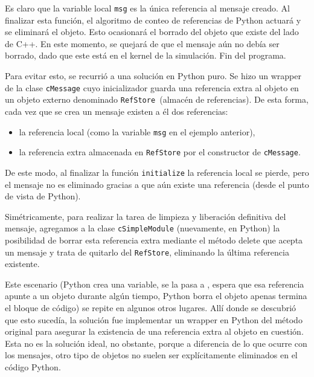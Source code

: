 \inputminted{Python}{codelistings/txc1.py}

Es claro que la variable local \verb!msg! es la única referencia al mensaje
creado. Al finalizar esta función, el algoritmo de conteo de referencias de
Python actuará y se eliminará el objeto. Esto ocasionará el borrado del objeto
que existe del lado de C++. En este momento, \omnetpp{} se quejará de que el
mensaje aún no debía ser borrado, dado que este está en el kernel de la
simulación. Fin del programa.

Para evitar esto, se recurrió a una solución en Python puro. Se hizo un wrapper
de la clase \verb!cMessage! cuyo inicializador guarda una referencia extra al objeto
en un objeto externo denominado \verb!RefStore !(almacén de referencias). De esta
forma, cada vez que se crea un mensaje existen a él dos referencias:

\begin{itemize}
    \item la referencia local (como la variable \verb!msg! en el ejemplo
anterior),

    \item la referencia extra almacenada en \verb!RefStore! por el constructor
de \verb!cMessage!.
\end{itemize}

De este modo, al finalizar la función \verb!initialize! la referencia local se
pierde, pero el mensaje no es eliminado gracias a que aún existe una referencia
(desde el punto de vista de Python). 

Simétricamente, para realizar la tarea de limpieza y liberación definitiva del
mensaje, agregamos a la clase \verb!cSimpleModule! (nuevamente, en Python) la
posibilidad de borrar esta referencia extra mediante el método delete que
acepta un mensaje y trata de quitarlo del \verb!RefStore!, eliminando la última
referencia existente.

Este escenario (Python crea una variable, se la pasa a \omnetpp{}, \omnetpp{}
espera que esa referencia apunte a un objeto durante algún tiempo, Python borra
el objeto apenas termina el bloque de código) se repite en algunos otros
lugares. Allí donde se descubrió que esto sucedía, la solución fue implementar
un wrapper en Python del método original para asegurar la existencia de una
referencia extra al objeto en cuestión. Esta no es la solución ideal, no
obstante, porque a diferencia de lo que ocurre con los mensajes, otro tipo de
objetos no suelen ser explícitamente eliminados en el código Python.

